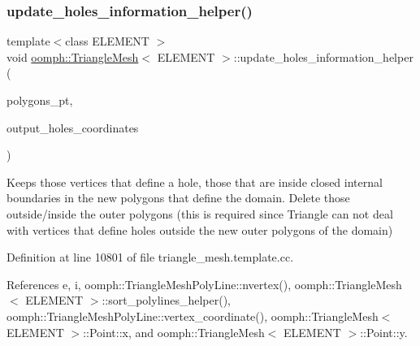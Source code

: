 \subsubsection{\texorpdfstring{update\+\_\+holes\+\_\+information\+\_\+helper()}{update\_holes\_information\_helper()}}
{\footnotesize\ttfamily template$<$class E\+L\+E\+M\+E\+NT $>$ \\
void \hyperlink{classoomph_1_1TriangleMesh}{oomph\+::\+Triangle\+Mesh}$<$ E\+L\+E\+M\+E\+NT $>$\+::update\+\_\+holes\+\_\+information\+\_\+helper (\begin{DoxyParamCaption}\item[{\hyperlink{classoomph_1_1Vector}{Vector}$<$ \hyperlink{classoomph_1_1TriangleMeshPolygon}{Triangle\+Mesh\+Polygon} $\ast$$>$ \&}]{polygons\+\_\+pt,  }\item[{\hyperlink{classoomph_1_1Vector}{Vector}$<$ \hyperlink{classoomph_1_1Vector}{Vector}$<$ double $>$ $>$ \&}]{output\+\_\+holes\+\_\+coordinates }\end{DoxyParamCaption})\hspace{0.3cm}{\ttfamily [protected]}}



Keeps those vertices that define a hole, those that are inside closed internal boundaries in the new polygons that define the domain. Delete those outside/inside the outer polygons (this is required since Triangle can not deal with vertices that define holes outside the new outer polygons of the domain) 



Definition at line 10801 of file triangle\+\_\+mesh.\+template.\+cc.



References e, i, oomph\+::\+Triangle\+Mesh\+Poly\+Line\+::nvertex(), oomph\+::\+Triangle\+Mesh$<$ E\+L\+E\+M\+E\+N\+T $>$\+::sort\+\_\+polylines\+\_\+helper(), oomph\+::\+Triangle\+Mesh\+Poly\+Line\+::vertex\+\_\+coordinate(), oomph\+::\+Triangle\+Mesh$<$ E\+L\+E\+M\+E\+N\+T $>$\+::\+Point\+::x, and oomph\+::\+Triangle\+Mesh$<$ E\+L\+E\+M\+E\+N\+T $>$\+::\+Point\+::y.

\mbox{\label{classoomph_1_1TriangleMesh_ae4922667cdfd747a3fbc5d391933ce31}} 
